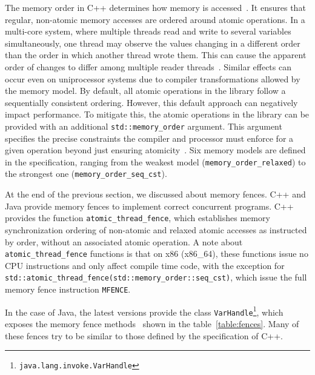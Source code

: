 The memory order in C++ determines how memory is accessed~\cite{memoryOrderCpp2020}. It ensures that regular, non-atomic memory accesses are ordered around atomic operations. In a multi-core system, where multiple threads read and write to several variables simultaneously, one thread may observe the values changing in a different order than the order in which another thread wrote them. This can cause the apparent order of changes to differ among multiple reader threads~\cite{memoryOrderCpp2020}. Similar effects can occur even on uniprocessor systems due to compiler transformations allowed by the memory model. By default, all atomic operations in the library follow a sequentially consistent ordering. However, this default approach can negatively impact performance. To mitigate this, the atomic operations in the library can be provided with an additional \texttt{std::memory\_order} argument. This argument specifies the precise constraints the compiler and processor must enforce for a given operation beyond just ensuring atomicity~\cite{memoryOrderCpp2020}. Six memory models are defined in the specification, ranging from the weakest model (\texttt{memory\_order\_relaxed}) to the strongest one (\texttt{memory\_order\_seq\_cst}).

At the end of the previous section, we discussed about memory fences. C++ and Java provide memory fences to implement correct concurrent programs. C++ provides the function \texttt{atomic\_thread\_fence}, which establishes memory synchronization ordering of non-atomic and relaxed atomic accesses as instructed by order, without an associated atomic operation. A note about \texttt{atomic\_thread\_fence} functions is that on x86 (x86\_64), these functions issue no CPU instructions and only affect compile time code, with the exception for \texttt{std::atomic\_thread\_fence(std::memory\_order::seq\_cst)}, which issue the full memory fence instruction \texttt{MFENCE}.

In the case of Java, the latest versions provide the class \texttt{VarHandle}\footnote{\texttt{java.lang.invoke.VarHandle}}, which exposes the memory fence methods~\cite{varHandleJdk92017} shown in the table~\ref{table:fences}. Many of these fences try to be similar to those defined by the specification of C++.

